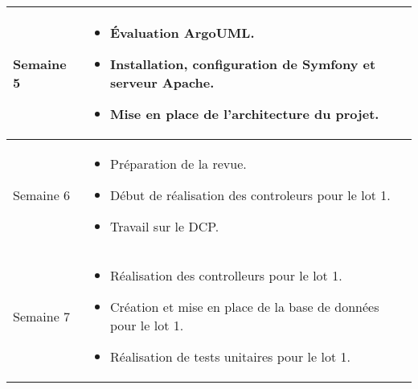 \documentclass [a4paper] {article}
\begin{document}
\section*{\Florian}

\begin{tabularx}{16.8cm}{|>{\columncolor{gray!40}}l|X|}
	\hline
	Semaine 5 & \begin{itemize}
        \item Évaluation ArgoUML.
        \item Installation, configuration de Symfony et serveur Apache.
        \item Mise en place de l'architecture du projet.
        \end{itemize}\\  
	\hline
        Semaine 6 & \begin{itemize}
	\item Préparation de la revue.
	\item Début de réalisation des controleurs pour le lot 1.
        \item Travail sur le DCP.  
	\end{itemize} \\
	\hline
        Semaine 7 & \begin{itemize}
	\item Réalisation des controlleurs pour le lot 1.
        \item Création et mise en place de la base de données pour le lot 1.
	\item Réalisation de tests unitaires pour le lot 1.
	\end{itemize} \\
	\hline
\end{tabularx}
\end{document}
